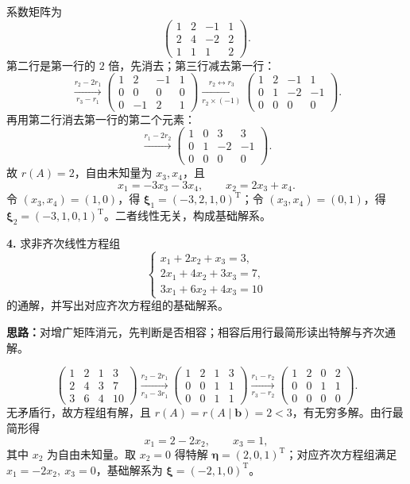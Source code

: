 系数矩阵为
\[
\begin{pmatrix}1&2&-1&1\\2&4&-2&2\\1&1&1&2\end{pmatrix}.
\]
第二行是第一行的 \(2\) 倍，先消去；第三行减去第一行：
\[
\xrightarrow[r_3-r_1]{r_2-2r_1}
\begin{pmatrix}1&2&-1&1\\0&0&0&0\\0&-1&2&1\end{pmatrix}
\xrightarrow[r_2\times(-1)]{r_2\leftrightarrow r_3}
\begin{pmatrix}1&2&-1&1\\0&1&-2&-1\\0&0&0&0\end{pmatrix}.
\]
再用第二行消去第一行的第二个元素：
\[
\xrightarrow{r_1-2r_2}
\begin{pmatrix}1&0&3&3\\0&1&-2&-1\\0&0&0&0\end{pmatrix}.
\]
故 \(r(A)=2\)，自由未知量为 \(x_3,x_4\)，且
\[
x_1=-3x_3-3x_4,\qquad x_2=2x_3+x_4.
\]
令 \((x_3,x_4)=(1,0)\)，得 \(\boldsymbol\xi_1=(-3,2,1,0)^{\mathrm T}\)；令 \((x_3,x_4)=(0,1)\)，得 \(\boldsymbol\xi_2=(-3,1,0,1)^{\mathrm T}\)。二者线性无关，构成基础解系。

\else \answerarea[10] \fi%

\textbf{4.} 求非齐次线性方程组
\[
\begin{cases}
x_1+2x_2+x_3=3,\\
2x_1+4x_2+3x_3=7,\\
3x_1+6x_2+4x_3=10
\end{cases}
\]
的通解，并写出对应齐次方程组的基础解系。

\ifshowsolutions%
\textbf{思路：}对增广矩阵消元，先判断是否相容；相容后用行最简形读出特解与齐次通解。

\[
\left(\begin{array}{ccc|c}
1&2&1&3\\2&4&3&7\\3&6&4&10
\end{array}\right)
\xrightarrow[r_3-3r_1]{r_2-2r_1}
\left(\begin{array}{ccc|c}
1&2&1&3\\0&0&1&1\\0&0&1&1
\end{array}\right)
\xrightarrow[r_3-r_2]{r_1-r_2}
\left(\begin{array}{ccc|c}
1&2&0&2\\0&0&1&1\\0&0&0&0
\end{array}\right).
\]
无矛盾行，故方程组有解，且 \(r(A)=r(A\mid\boldsymbol b)=2<3\)，有无穷多解。由行最简形得
\[
x_1=2-2x_2,\qquad x_3=1,
\]
其中 \(x_2\) 为自由未知量。取 \(x_2=0\) 得特解 \(\boldsymbol\eta=(2,0,1)^{\mathrm T}\)；对应齐次方程组满足 \(x_1=-2x_2,\ x_3=0\)，基础解系为 \(\boldsymbol\xi=(-2,1,0)^{\mathrm T}\)。

